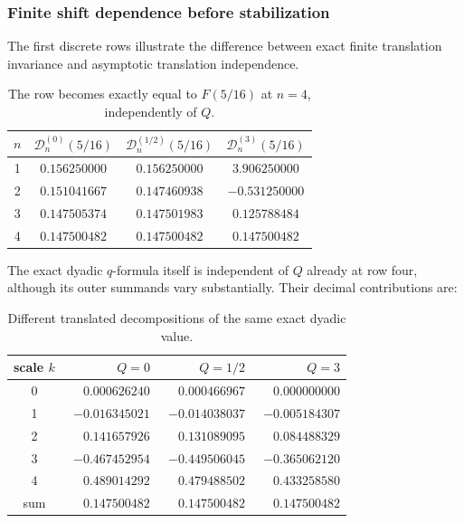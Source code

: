 \documentclass[11pt,oneside]{article}
\theoremstyle{definition}
\theoremstyle{remark}
\begin{document}
\subsubsection{Finite shift dependence before stabilization}

The first discrete rows illustrate the difference between exact finite translation invariance
and asymptotic translation independence.

\begin{table}[ht]
\centering
\small
\begin{tabular}{@{}c c c c@{}}
\toprule
$n$ & $\mathcal D_n^{(0)}(5/16)$ & $\mathcal D_n^{(1/2)}(5/16)$ & $\mathcal D_n^{(3)}(5/16)$ \\
\midrule
1 & $0.156250000$ & $0.156250000$ & $3.906250000$ \\
2 & $0.151041667$ & $0.147460938$ & $-0.531250000$ \\
3 & $0.147505374$ & $0.147501983$ & $0.125788484$ \\
4 & $0.147500482$ & $0.147500482$ & $0.147500482$ \\
\bottomrule
\end{tabular}
\caption{The row becomes exactly equal to $F(5/16)$ at $n=4$, independently of $Q$.}
\label{dyadicweb:tab:five-sixteen-D}
\end{table}

The exact dyadic $q$-formula itself is independent of $Q$ already at row four, although its
outer summands vary substantially.  Their decimal contributions are:

\begin{table}[ht]
\centering
\small
\begin{tabular}{@{}c r r r@{}}
\toprule
scale $k$ & $Q=0$ & $Q=1/2$ & $Q=3$ \\
\midrule
0 & $\phantom{-}0.000626240$ & $\phantom{-}0.000466967$ & $\phantom{-}0.000000000$ \\
1 & $-0.016345021$ & $-0.014038037$ & $-0.005184307$ \\
2 & $\phantom{-}0.141657926$ & $\phantom{-}0.131089095$ & $\phantom{-}0.084488329$ \\
3 & $-0.467452954$ & $-0.449506045$ & $-0.365062120$ \\
4 & $\phantom{-}0.489014292$ & $\phantom{-}0.479488502$ & $\phantom{-}0.433258580$ \\
\midrule
sum & $0.147500482$ & $0.147500482$ & $0.147500482$ \\
\bottomrule
\end{tabular}
\caption{Different translated decompositions of the same exact dyadic value.}
\label{dyadicweb:tab:five-sixteen-q-terms}
\end{table}
\end{document}
